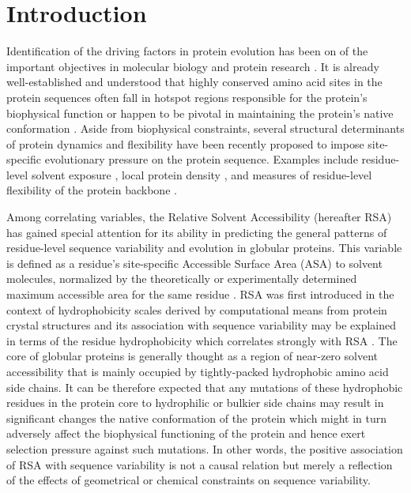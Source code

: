 \documentclass[12pt]{article}
\begin{document}
\section*{Introduction}

Identification of the driving factors in protein evolution has been on of the important objectives in molecular biology and protein research \citep{MarshTeichmann2014}. It is already well-established and understood that highly conserved amino acid sites in the protein sequences often fall in hotspot regions responsible for the protein's biophysical function or happen to be pivotal in maintaining the protein's native conformation \citep{li_proteinprotein_2004, keskin_hot_2005}. Aside from biophysical constraints, several structural determinants of protein dynamics and flexibility have been recently proposed to impose site-specific evolutionary pressure on the protein sequence. Examples include residue-level solvent exposure \citep{Ramseyetal2011,Scherreretal2012,MeyerWilke2013, other_authors}, local protein density \citep{liao_protein_2005, zhou_contact_2008, FranzosaXia2009,Yehetal2014}, and measures of residue-level flexibility of the protein backbone \citep{LiuBahar2012,NevinGereketal2013}.

Among correlating variables, the Relative Solvent Accessibility (hereafter RSA) has gained special attention for its ability in predicting the general patterns of residue-level sequence variability and evolution in globular proteins. This variable is defined as a residue's site-specific Accessible Surface Area (ASA) to solvent molecules, normalized by the theoretically or experimentally determined maximum accessible area for the same residue \citep{Rose1985,Tienetal2013}. RSA was first introduced in the context of hydrophobicity scales derived by computational means from protein crystal structures \citep{Chothia1976, Rose1985, Miller1987} and its association with sequence variability may be explained in terms of the residue hydrophobicity which correlates strongly with RSA \citep{moelbert_correlation_2004}. The core of globular proteins is generally thought as a region of near-zero solvent accessibility that is mainly occupied by tightly-packed hydrophobic amino acid side chains. It can be therefore expected that any mutations of these hydrophobic residues in the protein core to hydrophilic or bulkier side chains may result in significant changes the native conformation of the protein \citep{munson_what_1996} which might in turn adversely affect the biophysical functioning of the protein and hence exert selection pressure against such mutations. In other words, the positive association of RSA with sequence variability is not a causal relation but merely a reflection of the effects of geometrical or chemical constraints on sequence variability.
\end{document}
